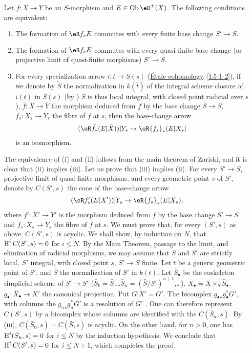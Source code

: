 \begin{proposition}\label{VII:5-1-1}
Let $f:X\to Y$ be an $S$-morphism and $E\in\ob \eD^+(X)$. The following
conditions are equivalent:
\begin{enumerate}[\indent (i)]
  \item The formation of $\eR f_\ast E$ commutes with every finite base
    change $S'\to S$.
  \item The formation of $\eR f_\ast E$ commutes with every quasi-finite base
    change (or projective limit of quasi-finite morphisms) $S'\to S$.
  \item For every specialization arrow $i:t\to S(s)$
    (\hyperref[I]{\'Etale cohomology}, \ref{I:5-1-2}), if we denote by
    $\widetilde S$ the normalization in $k(\bar t)$ of the integral scheme
    closure of $i(t)$ in $S(s)$ (by
    \cite[IV, 6.15.5, 18.6.11, 18.8.16]{ega}) $\bar S$ is thus local
    integral, with closed point radicial over $s$), $\bar f:\bar X\to \bar Y$
    the morphism deduced from $f$ by the base change $\bar S\to S$,
    $f_s:X_s\to Y_s$ the fibre of $f$ at $s$, then the base-change arrow
    \[
      (\eR \bar f_\ast (E|\bar X))|Y_s \to \eR {f_s}_\ast(E|X_s)
    \]
    is an isomorphism.
\end{enumerate}
\end{proposition}

The equivalence of (i) and (ii) follows from the main theorem of Zariski,
and it is clear that (ii) implies (iii). Let us prove that (iii) implies (ii). For
every $S'\to S$, projective limit of quasi-finite morphisms, and every geometric
point $s$ of $S'$, denote by $C(S',s)$ the cone of the base-change
arrow
\[
  (\eR f_\ast'(E|X'))|Y_s \to \eR{f_s}_\ast (E|X_s) \text{,}
\]
where $f':X'\to Y'$ is the morphism deduced from $f$ by the base change
$S'\to S$ and $f_s:X_s\to Y_s$ the fibre of $f$ at $s$. We must prove that,
for every $(S',s)$ as above, $C(S',s)$ is acyclic. We shall show, by
induction on $N$, that $\operatorname{H}^i C(S',s) = 0$ for $i\leqslant N$. By the Main
Theorem, passage to the limit, and elimination of radicial morphisms, we may
assume that $S$ and $S'$ are strictly local, $S'$ integral, with closed
point $s$, $S'\to S$ finite. Let $t$ be a generic geometric point
of $S'$, and $\bar S$ the normalization of $S'$ in $k(t)$. Let $\bar S_\bullet$
be the coskeleton simplicial scheme of $S'\to S'$
($\bar S_0=\bar S$,\ldots $\bar S_n=(\bar S/S')^{n+1}$,\ldots),
$X_\bullet=X\times_S \bar S_\bullet$. $g_\bullet:\bar X_\bullet \to X'$ the
canonical projection. Put $G|X'=G'$. The bicomplex
${g_\bullet}_\ast g_\bullet^\ast G'$, with columns the
${g_n}_\ast g_n^\ast G'$ is a resolution of $G'$ \cite[VIII 8]{sga4}. One
can therefore represent $C(S',s)$ by a bicomplex whose columns
are identified with the $C(\bar S_n,s)$. By (iii), $C(\bar S_0,s)=C(\bar S,s)$
is acyclic. On the other hand, for $n>0$, one has $\operatorname{H}^i(\bar S_n,s)=0$ for
$i\leqslant N$ by the induction hypothesis. We conclude that
$\operatorname{H}^i C(S',s)=0$ for $i\leqslant N+1$, which completes the proof.




